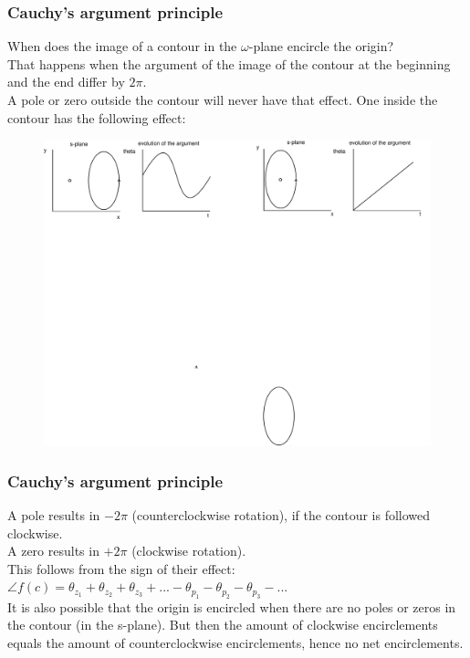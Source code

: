 \begin{frame}
	\frametitle{Cauchy's argument principle}
	When does the image of a contour in the $\omega$-plane encircle the origin?\\
	\medskip
	That happens when the argument of the image of the contour at the beginning and the end differ by $2\pi$.\\
	\medskip
	A pole or zero outside the contour will never have that effect. One inside the contour has the following effect:\\
	\medskip
	\begin{figure}
		\includegraphics[width=1\linewidth]{argument}
	\end{figure}
\end{frame}

\begin{frame}
	\frametitle{Cauchy's argument principle}
	\vspace{-4ex}
	A pole results in $-2\pi$ (counterclockwise rotation), if the contour is followed clockwise.\\
	\medskip
	A zero results in $+2\pi$ (clockwise rotation).\\
	\medskip
	This follows from the sign of their effect: $\angle f(c) = \theta_{z_{1}}+\theta_{z_{2}}+\theta_{z_{3}}+...-\theta_{p_{1}}-\theta_{p_{2}}-\theta_{p_{3}}-...$\\
	\bigskip
	It is also possible that the origin is encircled when there are no poles or zeros in the contour (in the s-plane). But then the amount of clockwise encirclements equals the amount of counterclockwise encirclements, hence no net encirclements.
\end{frame}

